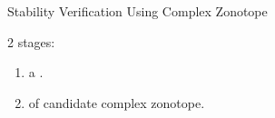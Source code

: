 
\begin{frame}{Stability Verification Using Complex Zonotope}
%
\begin{center}
{2 stages}:
\begin{enumerate}
\item {} a .
\item {} of candidate complex zonotope.
\end{enumerate}
\end{center}
%
\end{frame}


